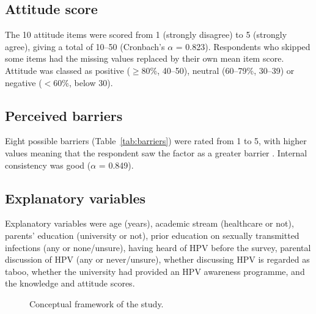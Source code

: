 \subsection{Attitude score}
The 10 attitude items were scored from 1 (strongly disagree) to 5 (strongly agree), giving a total of 10--50 (Cronbach's $\alpha$ = 0.823). Respondents who skipped some items had the missing values replaced by their own mean item score. Attitude was classed as positive ($\geq$80\%, 40--50), neutral (60--79\%, 30--39) or negative ($<$60\%, below 30).

\subsection{Perceived barriers}
Eight possible barriers (Table~\ref{tab:barriers}) were rated from 1 to 5, with higher values meaning that the respondent saw the factor as a greater barrier . Internal consistency was good ($\alpha$ = 0.849).

\subsection{Explanatory variables}
Explanatory variables were age (years), academic stream (healthcare or not), parents' education (university or not), prior education on sexually transmitted infections (any or none/unsure), having heard of HPV before the survey, parental discussion of HPV (any or never/unsure), whether discussing HPV is regarded as taboo, whether the university had provided an HPV awareness programme, and the knowledge and attitude scores.

\begin{figure}[htbp]
\centering
{}
\caption{Conceptual framework of the study.}\label{fig:framework}
\end{figure}
\FloatBarrier

